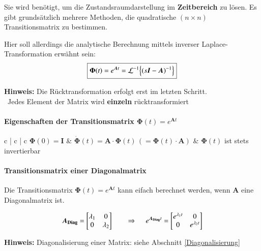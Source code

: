 \smallskip

Sie wird benötigt, um die Zustandsraumdarstellung im \textbf{Zeitbereich} zu lösen.
Es gibt grundsätzlich mehrere Methoden, die quadratische $(n \times n)$ Transitionsmatrix zu bestimmen.

\smallskip

Hier soll allerdings die analytische Berechnung mittels inverser Laplace-Transformation erwähnt sein:
$$ \boxed{ \bm{\Phi}(t) = e^{\bm{A} t} = \mathcal{L}^{-1} \Bigl\{ (s \bm{I} - \bm{A})^{-1} \Bigr\} } $$

\textbf{Hinweis:} Die Rücktransformation erfolgt erst im letzten Schritt. \\
\textrightarrow\ Jedes Element der Matrix wird \textbf{einzeln} rücktransformiert


\medskip

\paragraph{Eigenschaften der Transitionsmatrix $\bm{\Phi}(t) = e^{\bm{A} t}$}

\smallskip

\begin{ctabular}{c | c | c}
    $\bm{\Phi}(0) = \bm{I}$ & $\bm{\dot{\Phi}}(t) = \bm{A} \cdot \bm{\Phi}(t) \, (= \bm{\Phi}(t) \cdot \bm{A})$ & $\bm{\Phi}(t)$ ist stets invertierbar
\end{ctabular}



\paragraph{Transitionsmatrix einer Diagonalmatrix}

Die Transitionsmatrix $\bm{\Phi}(t) = e^{\bm{A} t}$ kann eifach berechnet werden, wenn $\bm{A}$ eine Diagonalmatrix ist.

$$
\bm{A_{\rm Diag}} = 
\begin{bmatrix}
    \lambda_1   & 0     \\
    0           & \lambda_2 
\end{bmatrix} 
\qquad \Rightarrow\ \quad
e^{\bm{A_{\rm Diag}} t} = 
\begin{bmatrix}
    e^{\lambda_1 t} & 0                 \\
    0               & e^{\lambda_2 t}
\end{bmatrix} 
$$

\textbf{Hinweis:} Diagonalisierung einer Matrix: siehe Abschnitt \ref{Diagonalisierung}


